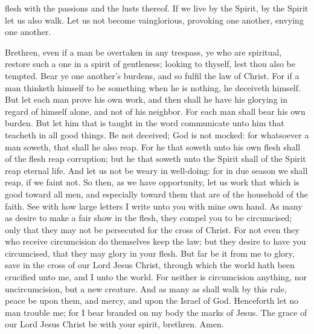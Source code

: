 flesh with the passions and the lusts thereof.  If we live by the Spirit, by the Spirit let us also walk. Let us not become vainglorious, provoking one another, envying one another. 

Brethren, even if a man be overtaken in any trespass, ye who are spiritual, restore such a one in a spirit of gentleness; looking to thyself, lest thou also be tempted. Bear ye one another’s burdens, and so fulfil the law of Christ. For if a man thinketh himself to be something when he is nothing, he deceiveth himself. But let each man prove his own work, and then shall he have his glorying in regard of himself alone, and not of his neighbor. For each man shall bear his own burden.  But let him that is taught in the word communicate unto him that teacheth in all good things. Be not deceived; God is not mocked: for whatsoever a man soweth, that shall he also reap. For he that soweth unto his own flesh shall of the flesh reap corruption; but he that soweth unto the Spirit shall of the Spirit reap eternal life. And let us not be weary in well-doing: for in due season we shall reap, if we faint not. So then, as we have opportunity, let us work that which is good toward all men, and especially toward them that are of the household of the faith.  See with how large letters I write unto you with mine own hand. As many as desire to make a fair show in the flesh, they compel you to be circumcised; only that they may not be persecuted for the cross of Christ. For not even they who receive circumcision do themselves keep the law; but they desire to have you circumcised, that they may glory in your flesh. But far be it from me to glory, save in the cross of our Lord Jesus Christ, through which the world hath been crucified unto me, and I unto the world. For neither is circumcision anything, nor uncircumcision, but a new creature. And as many as shall walk by this rule, peace be upon them, and mercy, and upon the Israel of God.  Henceforth let no man trouble me; for I bear branded on my body the marks of Jesus.  The grace of our Lord Jesus Christ be with your spirit, brethren. Amen. 